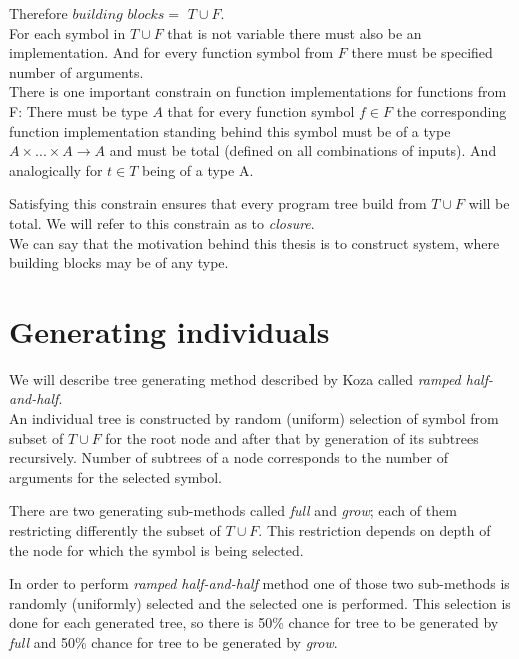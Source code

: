 \documentclass[12pt,a4paper]{report}
\begin{document}
\newcommand{\TuF}{$T \cup F$\xspace}

Therefore $building$ $blocks = $ \TuF.\\

For each symbol in \TuF that is not variable 
there must also be an implementation.
And for every function symbol from $F$ there must be specified 
number of arguments.\\

There is one important constrain on function implementations for functions from F:
There must be type $A$ that for every function symbol $f \in F$ the corresponding function implementation standing behind this symbol must be of a type 
$A \times ... \times A \rightarrow A$ and must be total (defined on all
combinations of inputs). And analogically for $t \in T$ being of a type A.  

Satisfying this constrain ensures that every program tree build 
from \TuF will be total. We will refer to this constrain as to \textit{closure}.\\

We can say that the motivation behind this thesis is to construct system,
where building blocks may be of any type. 

\section{Generating individuals}
\label{GPgene}

We will describe tree generating method described by Koza \cite{koza92}
called \textit{ramped half-and-half}. \\

An individual tree is constructed by random (uniform) selection of symbol from 
subset of \TuF for the root node and after that by generation of its 
subtrees recursively. 
Number of subtrees of a node corresponds 
to the number of arguments for the selected symbol. 

There are two generating sub-methods called \textit{full} and 
\textit{grow}; each of them restricting differently the subset of \TuF. 
This restriction depends on depth of the
node for which the symbol is being selected. 

In order to perform \textit{ramped half-and-half} method
one of those two sub-methods is randomly (uniformly) 
selected and the selected one is performed.
This selection is done for each generated tree, so there
is 50\% chance for tree to be generated by \textit{full} 
and 50\% chance for tree to be generated by \textit{grow}.\\
\end{document}
